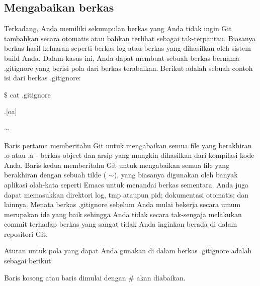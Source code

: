 \subsection {Mengabaikan berkas}
\vspace{14pt}
\noindent 
{\fontsize{14pt}{14pt}\selectfont Terkadang, Anda memiliki sekumpulan berkas yang Anda tidak ingin Git tambahkan secara otomatis atau bahkan terlihat sebagai tak-terpantau. Biasanya berkas hasil keluaran seperti berkas log atau berkas yang dihasilkan oleh sistem build Anda. Dalam kasus ini, Anda dapat membuat sebuah berkas bernama .gitignore yang berisi pola dari berkas terabaikan. Berikut adalah sebuah contoh isi dari berkas .gitignore: \\} \par
\vspace{14pt}
\noindent 
{\fontsize{14pt}{14pt}\selectfont  $  \$  $ cat .gitignore \\} \par
\noindent 
{\fontsize{14pt}{14pt}\selectfont *.[oa] \\} \par
\noindent 
{\fontsize{14pt}{14pt}\selectfont * $  \sim  $ \\} \par
\noindent 
{\fontsize{14pt}{14pt}\selectfont Baris pertama memberitahu Git untuk mengabaikan semua file yang berakhiran .o atau .a - berkas object dan arsip yang mungkin dihasilkan dari kompilasi kode Anda. Baris kedua memberitahu Git untuk mengabaikan semua file yang berakhiran dengan sebuah tilde ( $  \sim  $), yang biasanya digunakan oleh banyak aplikasi olah-kata seperti Emacs untuk menandai berkas sementara. Anda juga dapat memasukkan direktori log, tmp ataupun pid; dokumentasi otomatis; dan lainnya. Menata berkas .gitignore sebelum Anda mulai bekerja secara umum merupakan ide yang baik sehingga Anda tidak secara tak-sengaja melakukan commit terhadap berkas yang sangat tidak Anda inginkan berada di dalam repositori Git. \\} \par
\noindent 
{\fontsize{14pt}{14pt}\selectfont Aturan untuk pola yang dapat Anda gunakan di dalam berkas .gitignore adalah sebagai berikut: \\} \par
\vspace{14pt}
\noindent 
{\fontsize{14pt}{14pt}\selectfont Baris kosong atau baris dimulai dengan  $  \#  $ akan diabaikan. \\} \par
\vspace{14pt}
